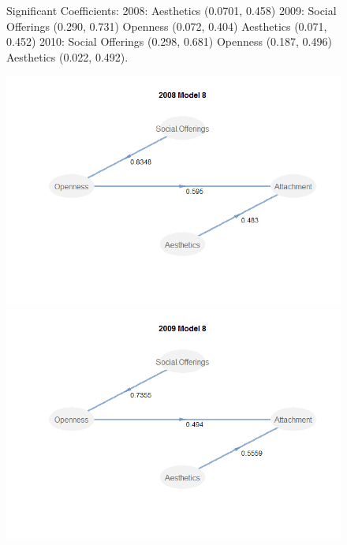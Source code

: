 \documentclass[11pt]{asaproc}
\begin{document}
\begin{figure}[H]
\begin{framed}
\begin{minipage}[b]{0.45\linewidth}
\end{minipage}
\hspace{0.5cm}
\begin{minipage}[b]{0.45\linewidth}
\centering
\caption{Significant Coefficients: 
2008: Aesthetics (0.0701, 0.458)
2009: Social Offerings (0.290, 0.731)
      Openness (0.072, 0.404)
      Aesthetics (0.071, 0.452)
2010: Social Offerings (0.298, 0.681)
      Openness (0.187, 0.496)
      Aesthetics (0.022, 0.492).}
\label{fig:PLSPMmodel1}
\end{minipage}
\end{framed}
\end{figure}

\begin{figure}[H]
\begin{framed}
\begin{minipage}[b]{0.45\linewidth}
\centering
\includegraphics[width=\textwidth]{Mod22008.png}
\end{minipage}
\hspace{0.5cm}
\begin{minipage}[b]{0.45\linewidth}
\centering
\includegraphics[width=\textwidth]{Mod22009.png}

\end{minipage}
\end{framed}
\end{figure}
\end{document}
